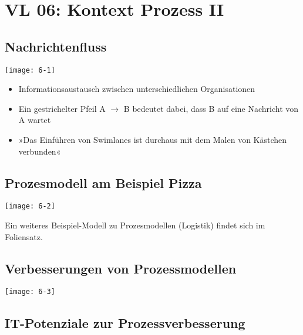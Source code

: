 \section{VL 06: Kontext Prozess II}

\subsection{Nachrichtenfluss}

\texttt{[image: 6-1]}

\begin{itemize}
  \item Informationsaustausch zwischen unterschiedlichen Organisationen
  \item Ein gestrichelter Pfeil A $\rightarrow$ B bedeutet dabei, dass B auf eine Nachricht von A wartet
  \item »Das Einführen von Swimlanes ist durchaus mit dem Malen von Kästchen verbunden«
\end{itemize}


\subsection{Prozesmodell am Beispiel Pizza}

\texttt{[image: 6-2]}

Ein weiteres Beispiel-Modell zu Prozesmodellen (Logistik) findet sich im Foliensatz.


\subsection{Verbesserungen von Prozessmodellen}

\texttt{[image: 6-3]}


\subsection{IT-Potenziale zur Prozessverbesserung}


